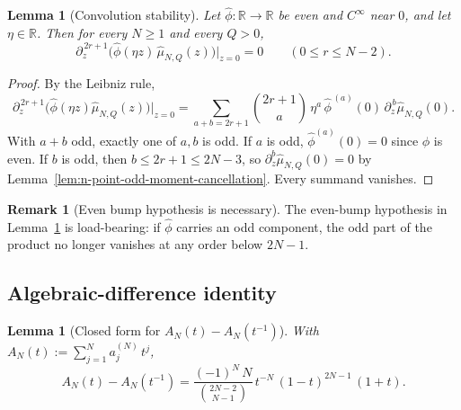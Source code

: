\documentclass[11pt,a4paper]{amsart}
\numberwithin{equation}{section}
\theoremstyle{plain}
\newtheorem{lemma}[theorem]{Lemma}
\theoremstyle{definition}
\newtheorem{remark}[theorem]{Remark}
\begin{document}
\begin{lemma}[Convolution stability]
\label{lem:n-point-convolution-parity}
Let \(\widehat\phi:\mathbb R\to\mathbb R\) be even and \(C^\infty\) near
\(0\), and let \(\eta\in\mathbb R\).  Then for every \(N\ge 1\) and
every \(Q>0\),
\begin{equation}
\label{eq:n-point-convolution-vanishing}
        \partial_z^{\,2r+1}
        \bigl(\widehat\phi(\eta z)\,\widehat\mu_{N,Q}(z)\bigr)
        \big|_{z=0}
        = 0
        \qquad (0 \le r \le N - 2).
\end{equation}
\end{lemma}

\begin{proof}
By the Leibniz rule,
\[
        \partial_z^{\,2r+1}
        \bigl(\widehat\phi(\eta z)\widehat\mu_{N,Q}(z)\bigr)\big|_{z=0}
        = \sum_{a+b = 2r+1}\binom{2r+1}{a}\,
          \eta^a\,\widehat\phi^{\,(a)}(0)\,
          \partial_z^{\,b}\widehat\mu_{N,Q}(0).
\]
With \(a+b\) odd, exactly one of \(a, b\) is odd.  If \(a\) is odd,
\(\widehat\phi^{(a)}(0)=0\) since \(\widehat\phi\) is even.  If \(b\) is
odd, then \(b\le 2r+1\le 2N-3\), so
\(\partial_z^b\widehat\mu_{N,Q}(0)=0\) by
Lemma~\ref{lem:n-point-odd-moment-cancellation}.  Every summand vanishes.
\end{proof}

\begin{remark}[Even bump hypothesis is necessary]
\label{rem:n-point-even-bump-necessary}
The even-bump hypothesis in
Lemma~\ref{lem:n-point-convolution-parity} is load-bearing: if
\(\widehat\phi\) carries an odd component, the odd part of the product
no longer vanishes at any order below \(2N-1\).
\end{remark}

\subsection{Algebraic-difference identity}
\label{subsec:n-point-difference-identity}

\begin{lemma}[Closed form for \(A_N(t)-A_N(t^{-1})\)]
\label{lem:A-N-difference}
With \(A_N(t):=\sum_{j=1}^N a_j^{(N)}\, t^j\),
\begin{equation}
\label{eq:A-N-difference}
        A_N(t) - A_N(t^{-1})
        = \frac{(-1)^N\,N}{\binom{2N-2}{N-1}}\,
          t^{-N}\,(1-t)^{2N-1}\,(1+t).
\end{equation}
\end{lemma}
\end{document}
